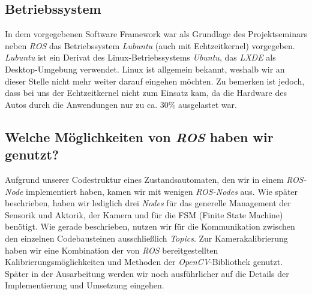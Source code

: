 \subsection{Betriebssystem}
In dem vorgegebenen Software Framework war als Grundlage des Projektseminars neben \textit{ROS} das Betriebssystem \textit{Lubuntu} (auch mit Echtzeitkernel) vorgegeben. \textit{Lubuntu} ist ein Derivat des Linux-Betriebssystems \textit{Ubuntu}, das \textit{LXDE} als Desktop-Umgebung verwendet. Linux ist allgemein bekannt, weshalb wir an dieser Stelle nicht mehr weiter darauf eingehen möchten. 
Zu bemerken ist jedoch, dass bei uns der Echtzeitkernel nicht zum Einsatz kam, da die Hardware des Autos durch die Anwendungen nur zu ca. 30\% ausgelastet war. 

\subsection{Welche Möglichkeiten von \textit{ROS} haben wir genutzt?}
Aufgrund unserer Codestruktur eines Zustandsautomaten, den wir in einem \textit{ROS-Node} implementiert haben, kamen wir mit wenigen \textit{ROS-Nodes} aus. Wie später beschrieben, haben wir lediglich drei \textit{Nodes} für das generelle Management der Sensorik und Aktorik, der Kamera und für die FSM (Finite State Machine) benötigt. Wie gerade beschrieben, nutzen wir für die Kommunikation zwischen den einzelnen Codebausteinen ausschließlich \textit{Topics}.
Zur Kamerakalibrierung haben wir eine Kombination der von \textit{ROS} bereitgestellten Kalibrierungsmöglichkeiten und Methoden der \textit{OpenCV}-Bibliothek genutzt. Später in der Ausarbeitung werden wir noch ausführlicher auf die Details der Implementierung und Umsetzung eingehen.  
